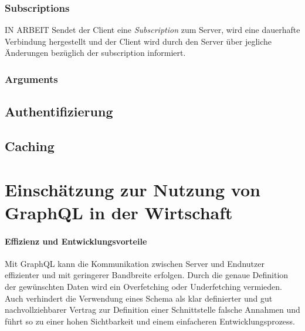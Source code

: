 \documentclass[11pt]{article}
\begin{document}
\subsubsection{Subscriptions}
IN ARBEIT
Sendet der Client eine \textit{Subscription} zum Server, wird eine dauerhafte Verbindung hergestellt und der Client wird durch den Server über jegliche Änderungen bezüglich der subscription informiert. 

\subsubsection{Arguments}


\subsection{Authentifizierung}
\subsection{Caching}



\newpage
\section{Einschätzung zur Nutzung von GraphQL in der Wirtschaft}
\paragraph{Effizienz und Entwicklungsvorteile}
Mit GraphQL kann die Kommunikation zwischen Server und Endnutzer effizienter und mit geringerer Bandbreite erfolgen. Durch die genaue Definition der gewünschten Daten wird ein Overfetching oder Underfetching vermieden. Auch verhindert die Verwendung eines Schema als klar definierter und gut nachvollziehbarer Vertrag zur Definition einer Schnittstelle falsche Annahmen und führt so zu einer hohen Sichtbarkeit und einem einfacheren Entwicklungsprozess.
\end{document}
